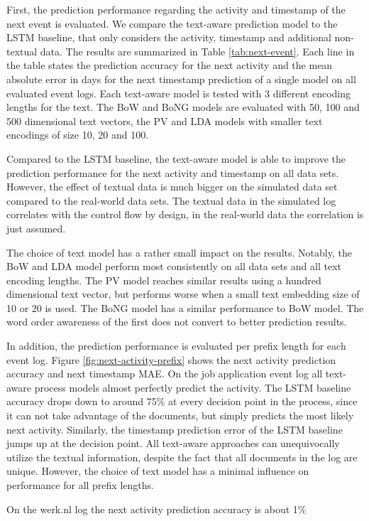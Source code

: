 First, the prediction performance regarding the activity and timestamp of the next event is evaluated.
We compare the text-aware prediction model to the LSTM baseline, that only considers the activity, timestamp and additional non-textual data.
The results are summarized in Table \ref{tab:next-event}.
Each line in the table states the prediction accuracy for the next activity and the mean absolute error in days for the next timestamp prediction of a single model on all evaluated event logs.
Each text-aware model is tested with 3 different encoding lengths for the text.
The BoW and BoNG models are evaluated with 50, 100 and 500 dimensional text vectors, the PV and LDA models with smaller text encodings of size 10, 20 and 100.

Compared to the LSTM baseline, the text-aware model is able to improve the prediction performance for the next activity and timestamp on all data sets.
However, the effect of textual data is much bigger on the simulated data set compared to the real-world data sets.
The textual data in the simulated log correlates with the control flow by design, in the real-world data the correlation is just assumed.

The choice of text model has a rather small impact on the results.
Notably, the BoW and LDA model perform most consistently on all data sets and all text encoding lengths.
The PV model reaches similar results using a hundred dimensional text vector, but performs worse when a small text embedding size of 10 or 20 is used.
The BoNG model has a similar performance to BoW model.
The word order awareness of the first does not convert to better prediction results.

In addition, the prediction performance is evaluated per prefix length for each event log.
Figure \ref{fig:next-activity-prefix} shows the next activity prediction accuracy and next timestamp MAE.
On the job application event log all text-aware process models almost perfectly predict the activity.
The LSTM baseline accuracy drops down to around 75\% at every decision point in the process, since it can not take advantage of the documents, but simply predicts the most likely next activity.
Similarly, the timestamp prediction error of the LSTM baseline jumps up at the decision point.
All text-aware approaches can unequivocally utilize the textual information, despite the fact that all documents in the log are unique.
However, the choice of text model has a minimal influence on performance for all prefix lengths.

On the werk.nl log the next activity prediction accuracy is about 1\% 


